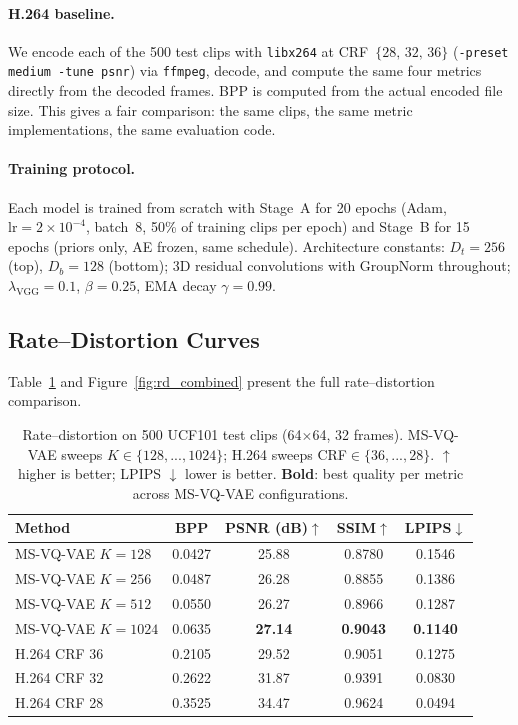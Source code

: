 \documentclass{article}
\newcommand{\model}{\textsc{MS-VQ-VAE}}
\begin{document}
\paragraph{H.264 baseline.}
We encode each of the 500 test clips with \texttt{libx264} at
CRF~$\{28,\,32,\,36\}$ (\texttt{-preset medium -tune psnr}) via
\texttt{ffmpeg}, decode, and compute the same four metrics directly from the
decoded frames.
BPP is computed from the actual encoded file size.
This gives a fair comparison: the same clips, the same metric implementations,
the same evaluation code.

\paragraph{Training protocol.}
Each model is trained from scratch with Stage~A for 20 epochs
(Adam, $\mathrm{lr}=2\times10^{-4}$, batch~8, 50\% of training clips per epoch)
and Stage~B for 15 epochs (priors only, AE frozen, same schedule).
Architecture constants: $D_t=256$ (top), $D_b=128$ (bottom);
3D residual convolutions with GroupNorm throughout;
$\lambda_\text{VGG}=0.1$, $\beta=0.25$, EMA decay $\gamma=0.99$.

\subsection{Rate--Distortion Curves}
\label{sec:rd_results}

Table~\ref{tab:rd} and Figure~\ref{fig:rd_combined} present the full
rate--distortion comparison.

\begin{table}[t]
\centering
\caption{%
  Rate--distortion on 500 UCF101 test clips (64$\times$64, 32 frames).
  \model{} sweeps $K\in\{128,...,1024\}$; H.264 sweeps CRF$\in\{36,...,28\}$.
  $\uparrow$ higher is better; LPIPS $\downarrow$ lower is better.
  \textbf{Bold}: best quality per metric across \model{} configurations.
}
\label{tab:rd}
\setlength{\tabcolsep}{8pt}
\begin{tabular}{lcccc}
\toprule
\textbf{Method} & \textbf{BPP} & \textbf{PSNR (dB)}$\uparrow$ &
\textbf{SSIM}$\uparrow$ & \textbf{LPIPS}$\downarrow$ \\
\midrule
\model{} $K{=}128$  & 0.0427 & 25.88          & 0.8780          & 0.1546          \\
\model{} $K{=}256$  & 0.0487 & 26.28          & 0.8855          & 0.1386          \\
\model{} $K{=}512$  & 0.0550 & 26.27          & 0.8966          & 0.1287          \\
\model{} $K{=}1024$ & 0.0635 & \textbf{27.14} & \textbf{0.9043} & \textbf{0.1140} \\
\midrule
H.264 CRF 36 & 0.2105 & 29.52 & 0.9051 & 0.1275 \\
H.264 CRF 32 & 0.2622 & 31.87 & 0.9391 & 0.0830 \\
H.264 CRF 28 & 0.3525 & 34.47 & 0.9624 & 0.0494 \\
\bottomrule
\end{tabular}
\end{table}
\end{document}
